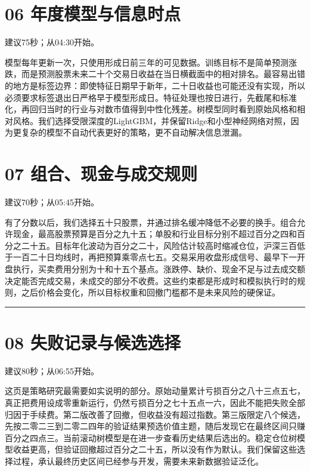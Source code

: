 \documentclass[UTF8,a4paper,12pt]{ctexart}
\begin{document}
\section*{\color{ink}06  年度模型与信息时点}

{\small\color{accent}建议75秒；从04:30开始。}\par

模型每年更新一次，只使用形成日前三年的可见数据。训练目标不是简单预测涨跌，而是预测股票未来二十个交易日收益在当日横截面中的相对排名。最容易出错的地方是标签边界：即使特征日期早于新年，二十日收益也可能还没有实现，所以必须要求标签退出日严格早于模型形成日。特征处理也按日进行，先截尾和标准化，再回归当时的行业与对数市值得到中性化残差。树模型同时看到原始风格和相对风格。我们选择受限深度的LightGBM，并保留Ridge和小型神经网络对照，因为更复杂的模型不自动代表更好的策略，更不自动解决信息泄漏。


\newpage
\section*{\color{ink}07  组合、现金与成交规则}

{\small\color{accent}建议70秒；从05:45开始。}\par

有了分数以后，我们选择五十只股票，并通过排名缓冲降低不必要的换手。组合允许现金，最高股票预算是百分之九十五；单股和行业目标分别不超过百分之四和百分之二十五。目标年化波动为百分之二十，风险估计较高时缩减仓位，沪深三百低于一百二十日均线时，再把预算乘零点七五。交易采用收盘形成信号、最早下一开盘执行，买卖费用分别为十和十五个基点。涨跌停、缺价、现金不足与过去成交额决定能否完成交易，未成交的部分不收费。这些约束都是形成时和模拟执行时的规则，之后价格会变化，所以目标权重和回撤门槛都不是未来风险的硬保证。


\vspace{6mm}\noindent\textcolor{accent!40}{\rule{\textwidth}{0.4pt}}\par

\section*{\color{ink}08  失败记录与候选选择}

{\small\color{accent}建议80秒；从06:55开始。}\par

这页是策略研究最需要如实说明的部分。原始动量累计亏损百分之八十三点五七，真正把费用设成零重新运行，仍然亏损百分之七十五点一六，因此不能把失败全部归因于手续费。第二版改善了回撤，但收益没有超过指数。第三版限定八个候选，先按二零二三到二零二四年的验证结果预选价值主题，随后发现它在最终区间只赚百分之四点三。当前滚动树模型是在进一步查看历史结果后选出的。稳定仓位树模型收益更高，但验证回撤超过百分之二十五，所以没有作为默认。我们保留这些选择过程，承认最终历史区间已经参与开发，需要未来新数据验证泛化。
\end{document}
